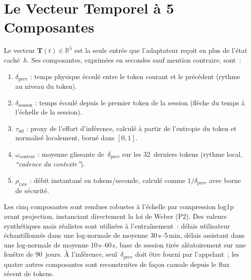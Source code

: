 \documentclass[10pt,twocolumn,letterpaper]{article}
\begin{document}
\section{Le Vecteur Temporel à 5 Composantes}

Le vecteur $\mathbf{T}(t) \in \mathbb{R}^5$ est la seule entrée que l'adaptateur reçoit en plus de l'état caché~$h$. Ses composantes, exprimées en secondes sauf mention contraire, sont~:

\begin{enumerate}[leftmargin=0.6cm, itemsep=2pt]
    \item $\delta_{\text{prev}}$ : temps physique écoulé entre le token courant et le précédent (rythme au niveau du token).
    \item $\delta_{\text{session}}$ : temps écoulé depuis le premier token de la session (flèche du temps à l'échelle de la session).
    \item $\tau_{\text{inf}}$ : proxy de l'effort d'inférence, calculé à partir de l'entropie du token et normalisé localement, borné dans $[0,1]$.
    \item $\omega_{\text{context}}$ : moyenne glissante de~$\delta_{\text{prev}}$ sur les 32~derniers tokens (rythme local, \emph{``cadence du contexte''}).
    \item $\rho_{\text{rate}}$ : débit instantané en tokens/seconde, calculé comme $1/\delta_{\text{prev}}$ avec borne de sécurité.
\end{enumerate}

Les cinq composantes sont rendues robustes à l'échelle par compression log1p avant projection, instanciant directement la loi de Weber (P2). Des valeurs synthétiques mais réalistes sont utilisées à l'entraînement~: délais utilisateur échantillonnés dans une log-normale de moyenne 30\,s--5\,min, délais assistant dans une log-normale de moyenne 10\,s--60\,s, base de session tirée aléatoirement sur une fenêtre de 90~jours. À l'inférence, seul~$\delta_{\text{prev}}$ doit être fourni par l'appelant~; les quatre autres composantes sont reconstruites de façon causale depuis le flux récent de tokens.
\end{document}

